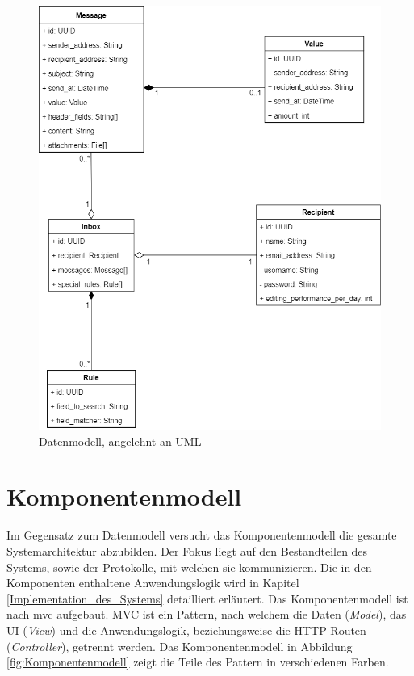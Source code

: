 \begin{figure}[!ht]
	\centering
		\includegraphics[width=1\textwidth]{Figures/Datenmodell.png}
	\caption{Datenmodell, angelehnt an UML}
	\label{fig:Datenmodell}
\end{figure}


\section{Komponentenmodell}
\label{Komponentendiagramm}
Im Gegensatz zum Datenmodell versucht das Komponentenmodell die gesamte Systemarchitektur abzubilden. Der Fokus liegt auf den Bestandteilen des Systems, sowie der Protokolle, mit welchen sie kommunizieren. Die in den Komponenten enthaltene Anwendungslogik wird in Kapitel \ref{Implementation_des_Systems} detailliert erläutert. Das Komponentenmodell ist nach \acrfull{mvc} aufgebaut. MVC ist ein Pattern, nach welchem die Daten (\textit{Model}), das UI (\textit{View}) und die Anwendungslogik, beziehungsweise die HTTP-Routen (\textit{Controller}), getrennt werden. Das Komponentenmodell in Abbildung \ref{fig:Komponentenmodell} zeigt die Teile des Pattern in verschiedenen Farben.

